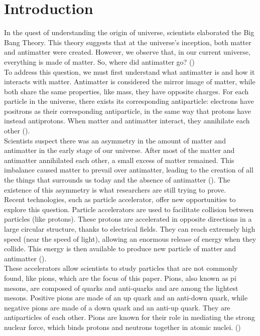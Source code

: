 \section*{Introduction}

In the quest of understanding the origin of universe, scientists elaborated the Big Bang Theory. This theory suggests that at the universe's inception, both matter and antimatter were created. However, we observe that, in our current universe, everything is made of matter. So, where did antimatter go? (\cite{robson2018}) 
\\

To address this question, we must first understand what antimatter is and how it interacts with matter. Antimatter is considered the mirror image of matter, while both share the same properties, like mass, they have opposite charges. For each particle in the universe, there exists its corresponding antiparticle: electrons have positrons as their corresponding antiparticle, in the same way that protons have instead antiprotons. When matter and antimatter interact, they annihilate each other (\cite{cern_matter_antimatter_asymmetry}).
\\

Scientists suspect there was an asymmetry in the amount of matter and antimatter in the early stage of our universe. After most of the matter and antimatter annihilated each other, a small excess of matter remained. This imbalance caused matter to prevail over antimatter, leading to the creation of all the things that surrounds us today and the absence of antimatter (\cite{cern_matter_antimatter_asymmetry}). The existence of this asymmetry is what researchers are still trying to prove.
\\

Recent technologies, such as particle accelerator, offer new opportunities to explore this question. Particle accelerators are used to facilitate collision between particles (like protons). These protons are accelerated in opposite directions in a large circular structure, thanks to electrical fields. They can reach extremely high speed (near the speed of light), allowing an enormous release of energy when they collide. This energy is then available to produce new particle of matter and antimatter (\cite{DOE2024}).
\\  

These accelerators allow scientists to study particles that are not commonly found, like pions, which are the focus of this paper.
Pions, also known as pi mesons, are composed of quarks and anti-quarks and are among the lightest mesons. Positive pions are made of an up quark and an anti-down quark, while negative pions are made of a down quark and an anti-up quark. They are antiparticles of each other. Pions are known for their role in mediating the strong nuclear force, which binds protons and neutrons together in atomic nuclei. (\cite{pasayten2021})
\\


